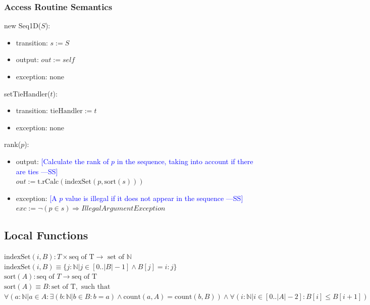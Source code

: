 \documentclass[12pt,fleqn]{examtst}
\newcommand{\authornote}[3]{\textcolor{#1}{[#3 ---#2]}}
\newcommand{\authornote}[3]{}
\newcommand{\wss}[1]{\authornote{blue}{SS}{#1}}
\begin{document}
\subsubsection* {Access Routine Semantics}

new Seq1D($S$):
\begin{itemize}
\item transition: $s := S$
\item output: $\mathit{out} := \mathit{self}$
\item exception: none
\end{itemize}

\noindent setTieHandler($t$):
\begin{itemize}
\item transition: $\mbox{tieHandler} := t$
\item exception: none
\end{itemize}

\noindent rank($p$):
\begin{itemize}
\item output: \wss{Calculate the rank of $p$ in the sequence, taking into
    account if there are ties} \\
    $out := \mbox{t.rCalc}(\mbox{indexSet}(p, \mbox{sort}(s)))$
\item exception: \wss{A $p$ value is illegal if it does not appear in the
    sequence} \\
    $exc := \lnot (p \in s) \Rightarrow IllegalArgumentException$
\end{itemize}

\subsection*{Local Functions}

\noindent $\mbox{indexSet}(i, B): T \times \mbox{seq of T}  \rightarrow \mbox{ set of }
\mathbb{N}$\\
\noindent $\mbox{indexSet}(i, B) \equiv \{j: \mathbb{N} | j \in [0..|B|-1]
\wedge B[j] = i : j \}$\\

\noindent $\mbox{sort}(A): \mbox{seq of } T \rightarrow \mbox{seq of T}$\\
\noindent $\mbox{sort}(A) \equiv B: \mbox{set of T}, \mbox{ such that }$\\
\noindent
$\forall (a: \mathbb{N} | a \in A : \exists(b: \mathbb{N} | b \in B: b = a)
\wedge \mbox{count}(a, A) = \mbox{count}(b, B)) \wedge \forall (i: \mathbb{N} |
i \in [0..|A|-2] : B[i] \leq B[i+1])$\\
\end{document}
